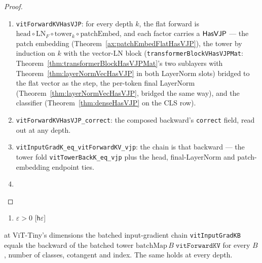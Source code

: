 \begin{proof}
\leanok
\begin{enumerate}
  \item \texttt{vitForwardKVHasVJP}: for every depth \(k\), the flat
    forward is \(\mathrm{head} \circ \mathrm{LN}_F \circ
    \mathrm{tower}_k \circ \mathrm{patchEmbed}\), and each factor
    carries a \(\mathsf{HasVJP}\) --- the patch embedding
    (Theorem~\ref{ax:patchEmbedFlatHasVJP}), the tower by induction
    on \(k\) with the vector-LN block (\texttt{transformerBlockVHasVJPMat}:
    Theorem~\ref{thm:transformerBlockHasVJPMat}'s two sublayers with
    Theorem~\ref{thm:layerNormVecHasVJP} in both LayerNorm slots) bridged
    to the flat vector as the step, the per-token final LayerNorm
    (Theorem~\ref{thm:layerNormVecHasVJP}, bridged the same way), and the
    classifier (Theorem~\ref{thm:denseHasVJP} on the CLS row).
  \item \texttt{vitForwardKVHasVJP\_correct}: the composed
    backward's \texttt{correct} field, read out at any depth.
  \item \texttt{vitInputGradK\_eq\_vitForwardKV\_vjp}: the chain is that
    backward --- the tower fold \texttt{vitTowerBackK\_eq\_vjp} plus the
    head, final-LayerNorm and patch-embedding endpoint ties.
  \item \Qed{}
\end{enumerate}
\end{proof}

\begin{theorem}
  \label{thm:vit_whole_back}
  \leanok
  \Assume{}
  \begin{enumerate}
    \item \(\varepsilon > 0\) \hfill[\texttt{h\(\varepsilon\)}]
  \end{enumerate}
  \Prove{} at ViT-Tiny's dimensions the batched input-gradient chain
  \texttt{vitInputGradKB} equals the backward of the batched tower
  \(\mathrm{batchMap}\, B\; \texttt{vitForwardKV}\) for every \(B\), number
  of classes, cotangent and index. The same holds at every depth.
\end{theorem}

